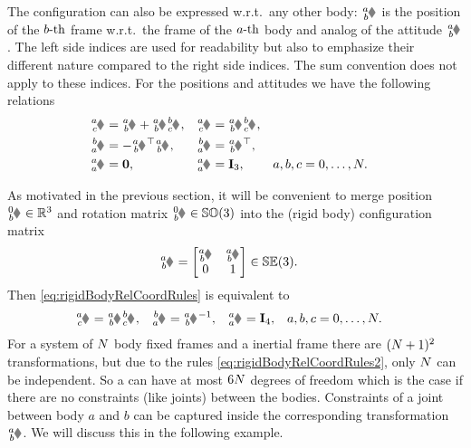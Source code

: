The configuration can also be expressed w.r.t.\ any other body: $\bodyPos{\BidxI}{\BidxII}$ is the position of the $b\text{-th}$ frame w.r.t.\ the frame of the $a\text{-th}$ body and analog of the attitude $\bodyRot{\BidxI}{\BidxII}$.
The left side indices are used for readability but also to emphasize their different nature compared to the right side indices.
The sum convention does not apply to these indices.
For the positions and attitudes we have the following relations
\begin{subequations}\label{eq:rigidBodyRelCoordRules}
\begin{align}
 \bodyPos{\BidxI}{\BidxIII} &= \bodyPos{\BidxI}{\BidxII} + \bodyRot{\BidxI}{\BidxII} \bodyPos{\BidxII}{\BidxIII},&
 \bodyRot{\BidxI}{\BidxIII} &= \bodyRot{\BidxI}{\BidxII} \bodyRot{\BidxII}{\BidxIII},
\\
 \bodyPos{\BidxII}{\BidxI} &= -\bodyRot{\BidxI}{\BidxII}^\top \bodyPos{\BidxI}{\BidxII},&
 \bodyRot{\BidxII}{\BidxI} &= \bodyRot{\BidxI}{\BidxII}^\top,&
\\
 \bodyPos{\BidxI}{\BidxI} &= \tuple{0},&
 \bodyRot{\BidxI}{\BidxI} &= \idMat[3],&
 \BidxI, \BidxII, \BidxIII &= 0,\ldots,\numRigidBodies.
\end{align}
\end{subequations}

As motivated in the previous section, it will be convenient to merge position $\bodyPos{0}{\BidxII} \in \RealNum^3$ and rotation matrix $\bodyRot{0}{\BidxII} \in \SpecialOrthogonalGroup(3)$ into the (rigid body) configuration matrix
\begin{align}
 \bodyHomoCoord{\BidxI}{\BidxII}{}{} &= \begin{bmatrix} \bodyRot{\BidxI}{\BidxII} & \bodyPos{\BidxI}{\BidxII}{} \\ 0 & 1 \end{bmatrix} \in \SpecialEuclideanGroup(3).
\end{align}
Then \eqref{eq:rigidBodyRelCoordRules} is equivalent to
\begin{align}\label{eq:rigidBodyRelCoordRules2}
 \bodyHomoCoord{\BidxI}{\BidxIII} &= \bodyHomoCoord{\BidxI}{\BidxII} \bodyHomoCoord{\BidxII}{\BidxIII},&
 \bodyHomoCoord{\BidxII}{\BidxI} &= \bodyHomoCoord{\BidxI}{\BidxII}^{-1},&
 \bodyHomoCoord{\BidxI}{\BidxI} &= \idMat[4],&
 \BidxI, \BidxII, \BidxIII &= 0,\ldots,\numRigidBodies.
\end{align}
For a system of $N$ body fixed frames and a inertial frame there are $(N+1)^2$ transformations, but due to the rules \eqref{eq:rigidBodyRelCoordRules2}, only $N$ can be independent.
So a \RBS can have at most $6N$ degrees of freedom which is the case if there are no constraints (like joints) between the bodies.
Constraints of a joint between body $a$ and $b$ can be captured inside the corresponding transformation $\bodyHomoCoord{\BidxI}{\BidxII}{}{}$.
We will discuss this in the following example.

